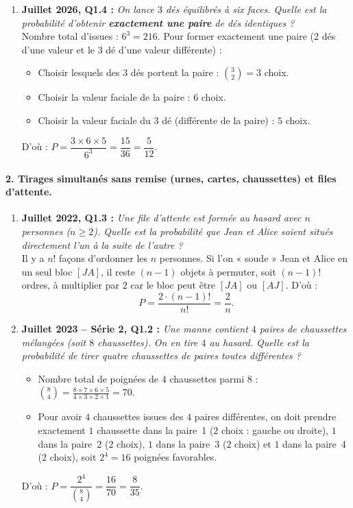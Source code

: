 \begin{exemple}
\begin{enumerate}
    \item \textbf{Juillet 2026, Q1.4 :} \emph{On lance $3$ dés équilibrés à six faces. Quelle est la probabilité d'obtenir \textbf{exactement une paire} de dés identiques ?}\\
    Nombre total d'issues : $6^3 = 216$. Pour former exactement une paire (2 dés d'une valeur et le 3\ieme{} dé d'une valeur différente) :
    \begin{itemize}
        \item Choisir lesquels des $3$ dés portent la paire : $\binom{3}{2} = 3$ choix.
        \item Choisir la valeur faciale de la paire : $6$ choix.
        \item Choisir la valeur faciale du 3\ieme{} dé (différente de la paire) : $5$ choix.
    \end{itemize}
    D'où : $P = \dfrac{3 \times 6 \times 5}{6^3} = \dfrac{15}{36} = \boxed{\dfrac{5}{12}}$.
\end{enumerate}

\paragraph{2. Tirages simultanés sans remise (urnes, cartes, chaussettes) et files d'attente.}
\begin{enumerate}[resume]
    \item \textbf{Juillet 2022, Q1.3 :} \emph{Une file d'attente est formée au hasard avec $n$ personnes ($n \ge 2$). Quelle est la probabilité que Jean et Alice soient situés directement l'un à la suite de l'autre ?}\\
    Il y a $n!$ façons d'ordonner les $n$ personnes. Si l'on « soude » Jean et Alice en un seul bloc $[JA]$, il reste $(n - 1)$ objets à permuter, soit $(n - 1)!$ ordres, à multiplier par $2$ car le bloc peut être $[JA]$ ou $[AJ]$. D'où :
    \[
        P = \frac{2 \cdot (n - 1)!}{n!} = \boxed{\frac{2}{n}}.
    \]

    \item \textbf{Juillet 2023 -- Série 2, Q1.2 :} \emph{Une manne contient $4$ paires de chaussettes mélangées (soit $8$ chaussettes). On en tire $4$ au hasard. Quelle est la probabilité de tirer quatre chaussettes de paires toutes différentes ?}\\
    \begin{itemize}
        \item Nombre total de poignées de $4$ chaussettes parmi $8$ : $\binom{8}{4} = \frac{8 \times 7 \times 6 \times 5}{4 \times 3 \times 2 \times 1} = 70$.
        \item Pour avoir $4$ chaussettes issues des $4$ paires différentes, on doit prendre exactement $1$ chaussette dans la paire~1 ($2$ choix : gauche ou droite), $1$ dans la paire~2 ($2$ choix), $1$ dans la paire~3 ($2$ choix) et $1$ dans la paire~4 ($2$ choix), soit $2^4 = 16$ poignées favorables.
    \end{itemize}
    D'où : $P = \dfrac{2^4}{\binom{8}{4}} = \dfrac{16}{70} = \boxed{\dfrac{8}{35}}$.


\end{enumerate}
\end{exemple}
